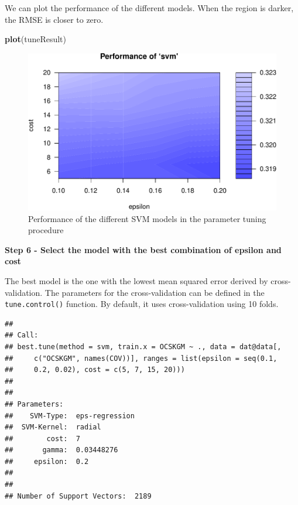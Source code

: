 \documentclass[10pt,b5paper,]{book}
\newenvironment{Shaded}{\begin{snugshade}}{\end{snugshade}}
\newcommand{\CommentTok}[1]{\textcolor[rgb]{0.56,0.35,0.01}{\textit{#1}}}
\newcommand{\KeywordTok}[1]{\textcolor[rgb]{0.13,0.29,0.53}{\textbf{#1}}}
\newcommand{\NormalTok}[1]{#1}
\newcommand{\OperatorTok}[1]{\textcolor[rgb]{0.81,0.36,0.00}{\textbf{#1}}}
\newcommand{\StringTok}[1]{\textcolor[rgb]{0.31,0.60,0.02}{#1}}
\theoremstyle{definition}
\theoremstyle{definition}
\theoremstyle{definition}
\theoremstyle{remark}
\begin{document}
We can plot the performance of the different models. When the region is
darker, the RMSE is closer to zero.

\begin{Shaded}
\begin{Highlighting}[]
\KeywordTok{plot}\NormalTok{(tuneResult)}
\end{Highlighting}
\end{Shaded}

\begin{figure}
\centering
\includegraphics{SOCMapping_files/figure-latex/unnamed-chunk-77-1.pdf}
\caption{\label{fig:unnamed-chunk-77}Performance of the different SVM models
in the parameter tuning procedure}
\end{figure}

\textbf{Step 6 - Select the model with the best combination of epsilon
and cost}

The best model is the one with the lowest mean squared error derived by
cross-validation. The parameters for the cross-validation can be defined
in the \texttt{tune.control()} function. By default, it uses
cross-validation using 10 folds.

\begin{Shaded}
\end{Shaded}

\begin{verbatim}
## 
## Call:
## best.tune(method = svm, train.x = OCSKGM ~ ., data = dat@data[, 
##     c("OCSKGM", names(COV))], ranges = list(epsilon = seq(0.1, 
##     0.2, 0.02), cost = c(5, 7, 15, 20)))
## 
## 
## Parameters:
##    SVM-Type:  eps-regression 
##  SVM-Kernel:  radial 
##        cost:  7 
##       gamma:  0.03448276 
##     epsilon:  0.2 
## 
## 
## Number of Support Vectors:  2189
\end{verbatim}
\end{document}
